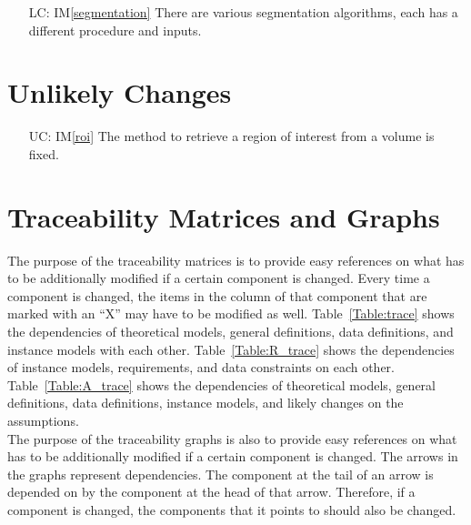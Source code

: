 \documentclass[12pt]{article}
\newcommand{\iref}[1]{IM\ref{#1}}
\newcounter{lcnum} %
\newcounter{ucnum} %
\begin{document}
\noindent \begin{itemize}

\item[LC\refstepcounter{lcnum}\thelcnum\label{LC_seg_algorithm}:] \iref{segmentation} There are various segmentation algorithms, each has a different procedure and inputs.
	
\end{itemize}

\section{Unlikely Changes}    

\noindent \begin{itemize}

\item[UC\refstepcounter{ucnum}\theucnum\label{UC_roi}:] \iref{roi} The method to retrieve a region of interest from a volume is fixed.
	
\end{itemize}


\section{Traceability Matrices and Graphs}

The purpose of the traceability matrices is to provide easy references on what
has to be additionally modified if a certain component is changed.  Every time a
component is changed, the items in the column of that component that are marked
with an ``X'' may have to be modified as well.  Table~\ref{Table:trace} shows the
dependencies of theoretical models, general definitions, data definitions, and
instance models with each other. Table~\ref{Table:R_trace} shows the
dependencies of instance models, requirements, and data constraints on each
other. Table~\ref{Table:A_trace} shows the dependencies of theoretical models,
general definitions, data definitions, instance models, and likely changes on
the assumptions.\\

\noindent The purpose of the traceability graphs is also to provide easy references on
what has to be additionally modified if a certain component is changed.  The
arrows in the graphs represent dependencies. The component at the tail of an
arrow is depended on by the component at the head of that arrow. Therefore, if a
component is changed, the components that it points to should also be
changed.
\end{document}
